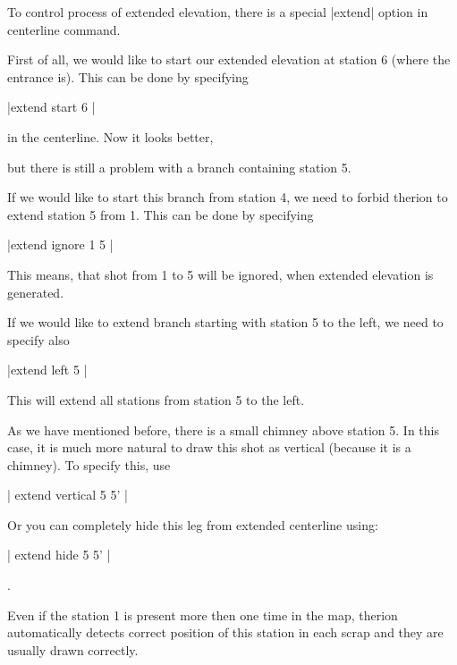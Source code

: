  To control process of extended elevation, there is a special
 |extend| option in centerline command. 




 First of all, we would like to start our extended elevation
 at station 6 (where the entrance is). This can be done by specifying


|extend start 6
|


 in the centerline. Now it looks better,







but there is still a problem with a branch containing station 5.




 If we would like to start this branch from station 4, we need
 to forbid therion to extend station 5 from 1. This can be done
 by specifying


|extend ignore 1 5
|


 This means, that shot from 1 to 5 will be ignored, when extended
 elevation is generated. 




 If we would like to extend branch starting
 with station 5 to the left, we need to specify also


|extend left 5
|


 This will extend all stations from station 5 to the left.







 As we have mentioned before, there is a small chimney above station 5.
 In this case, it is much more natural to draw this shot as vertical
 (because it is a chimney). To specify this, use 


|  extend vertical 5 5'
|





 Or you can completely hide this leg from extended centerline using:


|  extend hide 5 5'
|



.


 Even if the station 1 is present more then one time in the map, 
 therion automatically
 detects correct position of this station in each scrap and they are
 usually drawn correctly.





